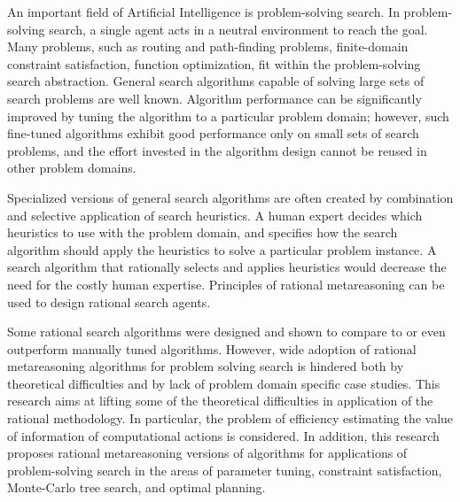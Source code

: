 An important field of Artificial Intelligence is
problem-solving search. In problem-solving search, a single agent acts
in a neutral environment to reach the goal. Many problems, such as
routing and path-finding problems, finite-domain constraint
satisfaction, function optimization, fit within the problem-solving
search abstraction. General search algorithms capable of solving large
sets of search problems are well known. Algorithm performance can be
significantly improved by tuning the algorithm to a particular problem
domain; however, such fine-tuned algorithms exhibit good performance
only on small sets of search problems, and the effort invested in the
algorithm design cannot be reused in other problem domains.

Specialized versions of general search algorithms are often created by
combination and selective application of search  heuristics.
A human expert decides which heuristics to use with the
problem domain, and specifies how the search algorithm should apply
the heuristics to solve a particular problem instance. A search
algorithm that rationally selects and applies heuristics would decrease
the need for the costly human expertise. Principles of rational
metareasoning can be used to design rational search agents.

Some rational search algorithms were designed and shown to compare to
or even outperform manually tuned algorithms. However, wide adoption
of rational metareasoning algorithms for problem solving search is
hindered both by theoretical difficulties and by lack of problem
domain specific case studies. This research aims at lifting some of
the theoretical difficulties in application of the rational
methodology. In particular, the problem of efficiency estimating
the value of information of computational actions is considered. In
addition, this research proposes rational metareasoning versions of
algorithms for applications of problem-solving search in the areas of
parameter tuning, constraint satisfaction, Monte-Carlo tree search,
and optimal planning.
